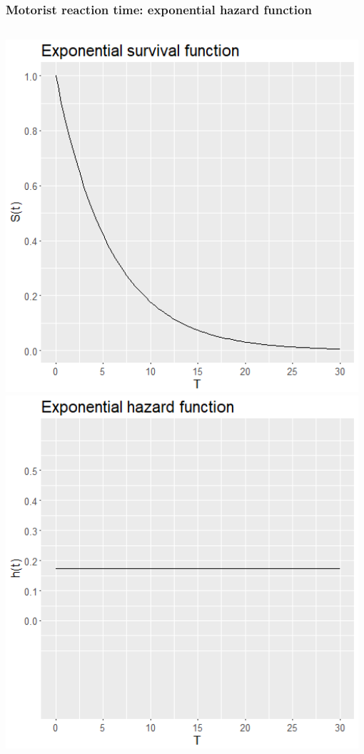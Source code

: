 \begin{frame}
\frametitle{Motorist reaction time: exponential hazard function}
\begin{columns}
\includegraphics[width=0.98\textwidth]{Figures/motorist_surv_exp.png}
\includegraphics[width=0.98\textwidth]{Figures/motorist_haz_exp.png}
\end{columns}
\end{frame}

